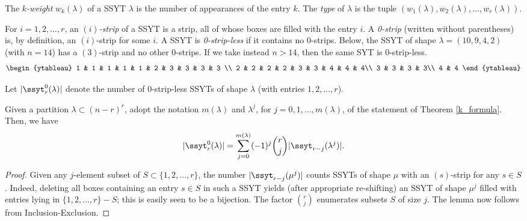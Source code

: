The \emph{$k$-weight} $w_k(\lambda)$ of a SSYT $\lambda$ is the number of appearances of the entry $k$. The \emph{type} of $\lambda$ is the tuple $(w_1(\lambda),w_2(\lambda),\ldots,w_r(\lambda))$.

For $i=1,2,\ldots,r$, an \emph{$(i)$-strip} of a SSYT is a strip, all of whose boxes are filled with the entry $i$. A \emph{0-strip} (written without parentheses) is, by definition, an $(i)$-strip for some $i$. A SSYT is \emph{0-strip-less} if it contains no 0-strips. Below, the SSYT of shape $\lambda=(10,9,4,2)$ (with $n=14$) has a $(3)$-strip and no other 0-strips. If we take instead $n>14$, then the same SYT is 0-strip-less.
\begin{equation*}
\begin{ytableau}
1 & 1 & 1 & 1 & 1 & 2 & 3 & 3 & 3 & 3 \\
2 & 2 & 2 & 2 & 3 & 3 & 4 & 4 & 4\\
3 & 3 & 3 & 3\\
4 & 4
\end{ytableau}
\end{equation*}

Let $|\ssyt^0_r(\lambda)|$ denote the number of 0-strip-less SSYTs of shape $\lambda$ (with entries $1,2,\ldots,r$).
\begin{lemma}\label{count_0strip}
Given a partition $\lambda\subset(n-r)^r$, adopt the notation $m(\lambda)$ and $\lambda^j$, for $j=0,1,\ldots,m(\lambda)$, of the statement of Theorem \ref{k_formula}. Then, we have
\begin{equation*}
|\ssyt^0_r(\lambda)|=\sum_{j=0}^{m(\lambda)}(-1)^j\binom{r}{j}|\ssyt_{r-j}(\lambda^j)|.
\end{equation*}
\end{lemma}
\begin{proof}
Given any $j$-element subset of $S\subset \{1,2,\ldots,r\}$, the number $|\ssyt_{r-j}(\mu^j)|$ counts SSYTs of shape $\mu$ with an $(s)$-strip for any $s\in S$. Indeed, deleting all boxes containing an entry $s\in S$ in such a SSYT yields (after appropriate re-shifting) an SSYT of shape $\mu^j$ filled with entries lying in $\{1,2,\ldots,r\}-S$; this is easily seen to be a bijection. The factor $\binom{r}{j}$ enumerates subsets $S$ of size $j$. The lemma now follows from Inclusion-Exclusion.
\end{proof}

